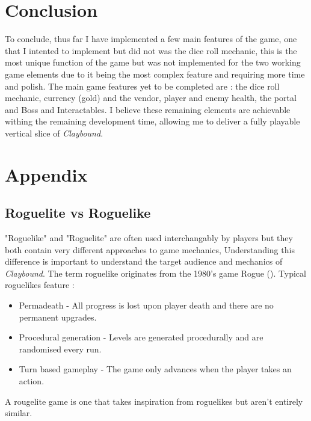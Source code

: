 \documentclass[progress]{cmpreport}
\begin{document}
\section{Conclusion}
To conclude, thus far I have implemented a few main features of the game, one that I intented to implement but did not was the dice roll mechanic, this is the most unique function of the game but was not implemented for the two working game elements due to it being the most complex feature and requiring more time and polish. 
The main game features yet to be completed are : the dice roll mechanic, currency (gold) and the vendor, player and enemy health, the portal and Boss and Interactables. I believe these remaining elements are achievable withing the remaining development time, allowing me to deliver a fully playable vertical slice of \emph{Claybound}.

\clearpage




\appendix
\clearpage

\section{Appendix}
\subsection{Roguelite vs Roguelike}
\label{sec:genre}
"Roguelike" and "Roguelite" are often used interchangably by players but they both contain very different approaches to game mechanics, Understanding this difference 
is important to understand the target audience and mechanics of \emph{Claybound}.
\newline
\newline
The term roguelike originates from the 1980's game Rogue (\cite{steam:Rogue}). Typical roguelikes feature \cite{screenrant:roguelike_vs_roguelite}:
\begin{itemize}
    \item Permadeath - All progress is lost upon player death and there are no permanent upgrades.
    \item Procedural generation - Levels are generated procedurally and are randomised every run.
    \item Turn based gameplay - The game only advances when the player takes an action.
\end{itemize}
A rougelite game is one that takes inspiration from roguelikes but aren't entirely similar. 
\clearpage
\end{document}
